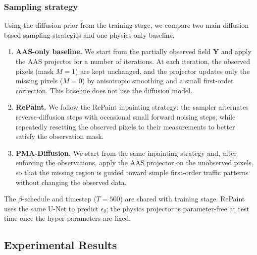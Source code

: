 \documentclass[a4paper,fleqn]{cas-sc}
\numberwithin{equation}{section}
\begin{document}
\subsubsection{Sampling strategy}
\label{sec:inference}
Using the diffusion prior from the training stage, we compare two main diffusion based sampling strategies and one physics-only baseline. 
\begin{enumerate}
\item \textbf{AAS-only baseline.}
    We start from the partially observed field $\mathbf Y$ and apply the AAS projector for a number of iterations. 
    At each iteration, the observed pixels (mask $M=1$) are kept unchanged, and the projector updates only the missing pixels ($M=0$) by anisotropic smoothing and a small first-order correction. 
    This baseline does not use the diffusion model.
\item \textbf{RePaint.}
    We follow the RePaint inpainting strategy: the sampler alternates reverse-diffusion steps with occasional small forward noising steps, while repeatedly resetting the observed pixels to their measurements to better satisfy the observation mask.
\item \textbf{PMA-Diffusion.}
    We start from the same inpainting strategy and, after enforcing the observations, apply the AAS projector on the unobserved pixels, so that the missing region is guided toward simple first-order traffic patterns without changing the observed data.
\end{enumerate}
The $\beta$-schedule and timestep ($T{=}500$) are shared with training stage. RePaint uses the same U-Net to predict $\epsilon_\theta$; the physics projector is parameter-free at test time once the hyper-parameters are fixed. 

\subsection{Experimental Results}
\label{sec:exp_results}
\end{document}
